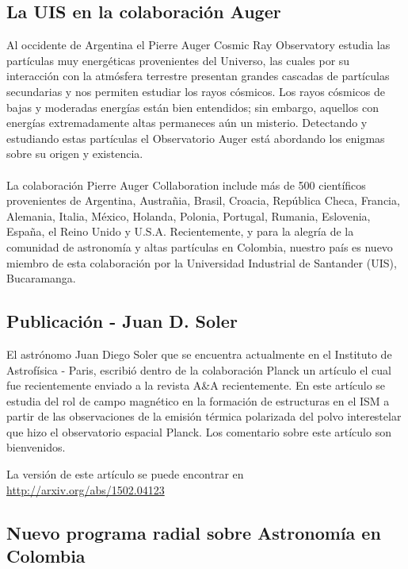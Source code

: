 \documentclass{book}
\begin{document}
\subsection{La UIS en la colaboración Auger}
Al occidente de Argentina el Pierre Auger Cosmic Ray Observatory estudia las partículas muy energéticas provenientes del Universo, las cuales por su interacción con la atmósfera terrestre presentan grandes cascadas de partículas secundarias y nos permiten estudiar los rayos cósmicos. Los rayos cósmicos de bajas y moderadas energías están bien entendidos; sin embargo, aquellos con energías extremadamente altas permaneces aún un misterio. Detectando y estudiando estas partículas el Observatorio Auger está abordando los enigmas sobre su origen y existencia.\\
\\
La colaboración Pierre Auger Collaboration include más de 500 científicos provenientes de Argentina, Austrañia, Brasil, Croacia, República Checa, Francia, Alemania, Italia, México, Holanda, Polonia, Portugal, Rumania, Eslovenia, España, el Reino Unido y U.S.A. Recientemente, y para la alegría de la comunidad de astronomía y altas partículas en Colombia, nuestro país es nuevo miembro de esta colaboración por la Universidad Industrial de Santander (UIS), Bucaramanga. \\


\subsection{Publicación - Juan D. Soler}

El astrónomo Juan Diego Soler que se encuentra actualmente en el Instituto de Astrofísica - Paris,  escribió dentro de la colaboración Planck un artículo el cual fue recientemente enviado a la revista A\&A recientemente.
En este artículo se estudia del rol de campo magnético en la formación de estructuras en el ISM a partir de las observaciones de la emisión térmica polarizada del polvo interestelar que hizo el observatorio espacial Planck. Los comentario sobre este artículo son bienvenidos.

La versión de este artículo se puede encontrar en\\
 
\url{http://arxiv.org/abs/1502.04123}

\subsection{Nuevo programa radial sobre Astronomía en Colombia}
\end{document}

